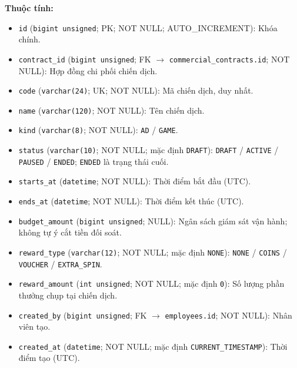 \textbf{Thuộc tính:}

\begin{itemize}

\item \texttt{id} (\texttt{bigint unsigned}; PK; NOT NULL; AUTO_INCREMENT): Khóa chính.

\item \texttt{contract\_id} (\texttt{bigint unsigned}; FK $\rightarrow$ \texttt{commercial\_contracts.id}; NOT NULL): Hợp đồng chi phối chiến dịch.

\item \texttt{code} (\texttt{varchar(24)}; UK; NOT NULL): Mã chiến dịch, duy nhất.

\item \texttt{name} (\texttt{varchar(120)}; NOT NULL): Tên chiến dịch.

\item \texttt{kind} (\texttt{varchar(8)}; NOT NULL): \texttt{AD} / \texttt{GAME}.

\item \texttt{status} (\texttt{varchar(10)}; NOT NULL; mặc định \texttt{DRAFT}): \texttt{DRAFT} / \texttt{ACTIVE} / \texttt{PAUSED} / \texttt{ENDED}; \texttt{ENDED} là trạng thái cuối.

\item \texttt{starts\_at} (\texttt{datetime}; NOT NULL): Thời điểm bắt đầu (UTC).

\item \texttt{ends\_at} (\texttt{datetime}; NOT NULL): Thời điểm kết thúc (UTC).

\item \texttt{budget\_amount} (\texttt{bigint unsigned}; NULL): Ngân sách giám sát vận hành; không tự ý cắt tiền đối soát.

\item \texttt{reward\_type} (\texttt{varchar(12)}; NOT NULL; mặc định \texttt{NONE}): \texttt{NONE} / \texttt{COINS} / \texttt{VOUCHER} / \texttt{EXTRA\_SPIN}.

\item \texttt{reward\_amount} (\texttt{int unsigned}; NOT NULL; mặc định \texttt{0}): Số lượng phần thưởng chụp tại chiến dịch.

\item \texttt{created\_by} (\texttt{bigint unsigned}; FK $\rightarrow$ \texttt{employees.id}; NOT NULL): Nhân viên tạo.

\item \texttt{created\_at} (\texttt{datetime}; NOT NULL; mặc định \texttt{CURRENT\_TIMESTAMP}): Thời điểm tạo (UTC).

\end{itemize}

